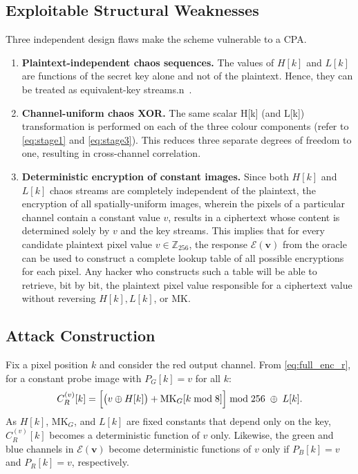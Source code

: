 \subsection{Exploitable Structural Weaknesses}
\label{subsec:weaknesses}

Three independent design flaws make the scheme vulnerable to a CPA.

\begin{enumerate}
\item \textbf{Plaintext-independent chaos sequences.} The values of $H[k]$ and $L[k]$
      are functions of the secret key alone and not of the plaintext.
      Hence, they can be treated as equivalent-key streams.n~\cite{wen2023cryptanalysis}.

\item \textbf{Channel-uniform chaos XOR.} The same scalar H[k] (and L[k]) transformation is performed on each of the three colour components (refer to \eqref{eq:stage1} and \eqref{eq:stage3}). This reduces three separate degrees of freedom to one, resulting in cross-channel correlation.

\item \textbf{Deterministic encryption of constant images.} Since both $H[k]$ and
      $L[k]$ chaos streams are completely independent of the plaintext, the
      encryption of all spatially-uniform images, wherein the pixels of a
      particular channel contain a constant value $v$, results in a
      ciphertext whose content is determined solely by $v$ and the key
      streams. This implies that for every candidate plaintext pixel value
      $v \in \mathbb{Z}_{256}$, the response $\mathcal{E}(\mathbf{v})$
      from the oracle can be used to construct a complete lookup table of
      all possible encryptions for each pixel. Any hacker who constructs
      such a table will be able to retrieve, bit by bit, the plaintext
      pixel value responsible for a ciphertext value without reversing
      $H[k], L[k]$, or $\mathrm{MK}$.
\end{enumerate}

\subsection{Attack Construction}
\label{subsec:attack}

Fix a pixel position $k$ and consider the red output channel. From
\eqref{eq:full_enc_r}, for a constant probe image with $P_G[k] = v$ for all $k$:
\begin{equation}
  C_R^{(v)}[k]
    = \Bigl[\bigl(v \oplus H[k]\bigr) + \mathrm{MK}_G[k \bmod 8]\Bigr]
      \bmod 256 \;\oplus\; L[k].
  \label{eq:probe_r}
\end{equation}
As $H[k]$, $\mathrm{MK}_G$, and $L[k]$ are fixed constants that depend only on
the key, $C_R^{(v)}[k]$ becomes a deterministic function of $v$ only. Likewise,
the green and blue channels in $\mathcal{E}(\mathbf{v})$ become deterministic
functions of $v$ only if $P_B[k] = v$ and $P_R[k] = v$, respectively.


